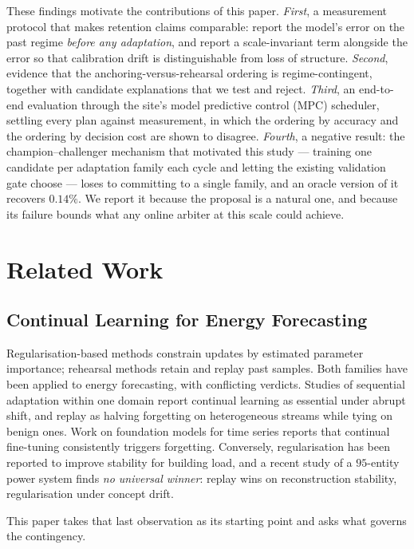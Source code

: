 \documentclass[journal]{IEEEtran}
\begin{document}
These findings motivate the contributions of this paper.
\emph{First}, a measurement protocol that makes retention claims comparable:
report the model's error on the past regime \emph{before any adaptation}, and
report a scale-invariant term alongside the error so that calibration drift is
distinguishable from loss of structure.
\emph{Second}, evidence that the anchoring-versus-rehearsal ordering is
regime-contingent, together with candidate explanations that we test and
reject.
\emph{Third}, an end-to-end evaluation through the site's model predictive
control (MPC) scheduler, settling every plan against measurement, in which the
ordering by accuracy and the ordering by decision cost are shown to disagree.
\emph{Fourth}, a negative result: the champion--challenger mechanism that
motivated this study --- training one candidate per adaptation family each
cycle and letting the existing validation gate choose --- loses to committing
to a single family, and an oracle version of it recovers $0.14\%$. We report it
because the proposal is a natural one, and because its failure bounds what any
online arbiter at this scale could achieve.

\section{Related Work}
\label{sec:related}

\subsection{Continual Learning for Energy Forecasting}
Regularisation-based methods constrain updates by estimated parameter
importance; rehearsal methods retain and replay past samples. Both families have
been applied to energy forecasting, with conflicting verdicts. Studies of
sequential adaptation within one domain report continual learning as essential
under abrupt shift, and replay as halving forgetting on heterogeneous streams
while tying on benign ones. Work on foundation models for time series reports
that continual fine-tuning consistently triggers forgetting. Conversely,
regularisation has been reported to improve stability for building load, and a
recent study of a $95$-entity power system finds \emph{no universal winner}:
replay wins on reconstruction stability, regularisation under concept drift.

This paper takes that last observation as its starting point and asks what
governs the contingency.
\end{document}
